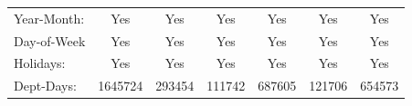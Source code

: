 {\begin{tabular}{l*{6}{c}}
Year-Month: &         Yes         &         Yes         &         Yes         &         Yes         &         Yes         &         Yes         \\
Day-of-Week &         Yes         &         Yes         &         Yes         &         Yes         &         Yes         &         Yes         \\
Holidays:   &         Yes         &         Yes         &         Yes         &         Yes         &         Yes         &         Yes         \\
Dept-Days:  &     1645724         &      293454         &      111742         &      687605         &      121706         &      654573         \\
\hline \end{tabular}}
